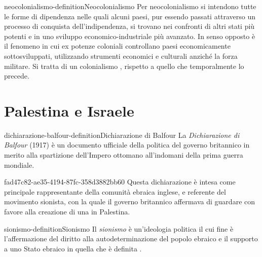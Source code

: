 \documentclass[preview]{standalone}
\begin{document}
\begin{snippetdefinition}{neocolonialismo-definition}{Neocolonialismo}
    Per neocolonialismo si intendono tutte le forme di dipendenza nelle quali alcuni paesi,
    pur essendo passati attraverso un processo di conquista dell'indipendenza,
    si trovano nei confronti di altri stati più potenti e in uno
    sviluppo economico-industriale più avanzato.
    In senso opposto è il fenomeno in cui ex potenze coloniali controllano paesi
    economicamente sottosviluppati, utilizzando strumenti economici e
    culturali anziché la forza militare.
    Si tratta di un colonialismo ,
    rispetto a quello  che temporalmente lo precede.
\end{snippetdefinition}



\section{Palestina e Israele}


\begin{snippetdefinition}{dichiarazione-balfour-definition}{Dichiarazione di Balfour}
    La \textit{Dichiarazione di Balfour} (1917) è un documento ufficiale della politica del
    governo britannico in merito alla spartizione dell'Impero
    ottomano all'indomani della prima guerra mondiale.
\end{snippetdefinition}

\begin{snippet}{fad47c82-ae35-4194-87fc-358d3882bb60}
    Questa dichiarazione è intesa come principale rappresentante della
    comunità ebraica inglese, e referente del movimento
    sionista, con la quale il governo britannico affermava di guardare
    con favore alla creazione di una  in Palestina.
\end{snippet}

\begin{snippetdefinition}{sionismo-definition}{Sionismo}
    Il \textit{sionismo} è un'ideologia politica il cui fine è l'affermazione del
    diritto alla autodeterminazione del popolo ebraico e il supporto a uno
    Stato ebraico in quella che è definita .
\end{snippetdefinition}
\end{document}
